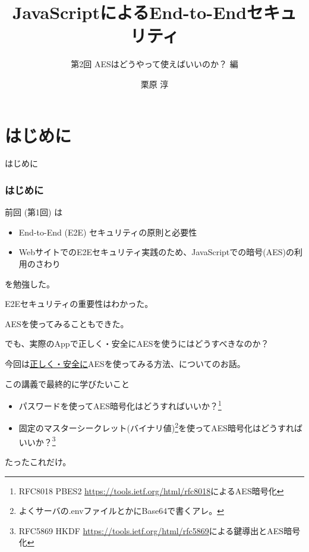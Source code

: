 \documentclass[12pt,dvipdfmx]{beamer}
\title[E2E Security with JS 02]{JavaScriptによるEnd-to-Endセキュリティ}
\subtitle{第2回 AESはどうやって使えばいいのか？ 編}
\author[Jun Kurihara]{栗原 淳}
\institute[]{}
\date[]{}
\begin{document}
\begin{frame}
\titlepage
\end{frame}

\section{はじめに}
\begin{frame}
 \centering
 {\Large はじめに}
\end{frame}

\begin{frame}
\frametitle{はじめに}
前回 (第1回) は
\begin{itemize}
 \item End-to-End (E2E) セキュリティの原則と必要性
 \item WebサイトでのE2Eセキュリティ実践のため、JavaScriptでの暗号(AES)の利用のさわり
\end{itemize}
を勉強した。

\vspace{2ex}

E2Eセキュリティの重要性はわかった。

AESを使ってみることもできた。

\vspace{2ex}

でも、実際のAppで\alert{正しく・安全にAESを使うにはどうすべきなのか？}
\end{frame}

\begin{frame}
今回は\underline{正しく・安全に}AESを使ってみる方法、についてのお話。

\begin{block}{\small この講義で最終的に学びたいこと}
\begin{itemize}
\item パスワードを使ってAES暗号化はどうすればいいか？\footnote[frame]{\scriptsize RFC8018 PBES2 \url{https://tools.ietf.org/html/rfc8018}によるAES暗号化}
\item 固定のマスターシークレット(バイナリ値)\footnote[frame]{\scriptsize よくサーバの.envファイルとかにBase64で書くアレ。}を使ってAES暗号化はどうすればいいか？\footnote[frame]{\scriptsize RFC5869 HKDF \url{https://tools.ietf.org/html/rfc5869}による鍵導出とAES暗号化}
\end{itemize}
\end{block}

\vspace{2ex}

たったこれだけ。

\end{frame}
\end{document}

